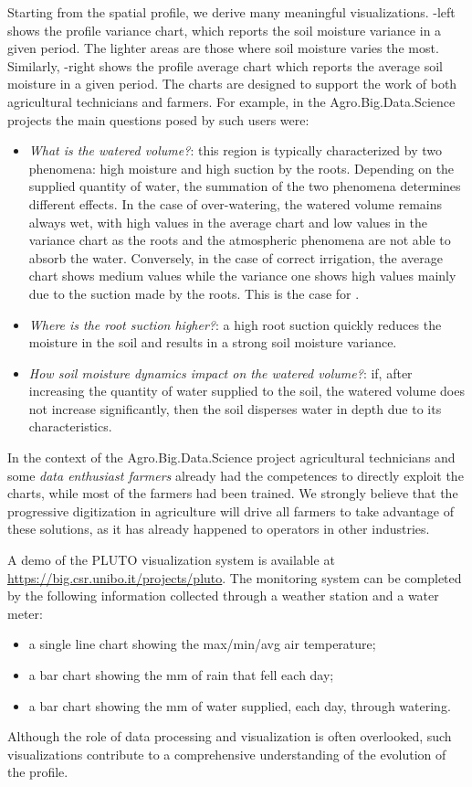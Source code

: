 Starting from the spatial profile, we derive many meaningful visualizations. -left shows the profile variance chart, which reports the soil moisture variance in a given period.
The lighter areas are those where soil moisture varies the most. Similarly, -right shows the profile average chart which reports the average soil moisture in a given period.
The charts are designed to support the work of both agricultural technicians and farmers. For example, in the Agro.Big.Data.Science projects the main questions posed by such users were:
\begin{itemize}
    \item \emph{What is the watered volume?}:
    this region is typically characterized by two phenomena: high moisture and high suction by the roots.
    Depending on the supplied quantity of water, the summation of the two phenomena determines different effects.
    In the case of over-watering, the watered volume remains always wet, with high values in the average chart and low values in the variance chart as the roots and the atmospheric phenomena are not able to absorb the water.
    Conversely, in the case of correct irrigation, the average chart shows medium values while the variance one shows high values mainly due to the suction made by the roots. This is the case for . 
    \item \emph{Where is the root suction higher?}: 
    a high root suction quickly reduces the moisture in the soil and results in a strong soil moisture variance. 
    \item \emph{How soil moisture dynamics impact on the watered volume?}: if, after increasing the quantity of water supplied to the soil, the watered volume does not increase significantly, then the soil disperses water in depth due to its characteristics.
\end{itemize}
In the context of the Agro.Big.Data.Science project agricultural technicians and some \emph{data enthusiast farmers} \cite{morton2014support} already had the competences to directly exploit the charts, while most of the farmers had been trained. We strongly believe that the progressive digitization in agriculture will drive all farmers to take advantage of these solutions, as it has already happened to operators in other industries.

A demo of the PLUTO visualization system is available at \url{https://big.csr.unibo.it/projects/pluto}. The monitoring system can be completed by the following information collected through a weather station and a water meter:
\begin{itemize}
    \item a single line chart showing the max/min/avg air temperature;
    \item a bar chart showing the mm of rain that fell each day;
    \item a bar chart showing the mm of water supplied, each day, through watering. 
\end{itemize}
Although the role of data processing and visualization is often overlooked, such visualizations contribute to a comprehensive understanding of the evolution of the profile.

